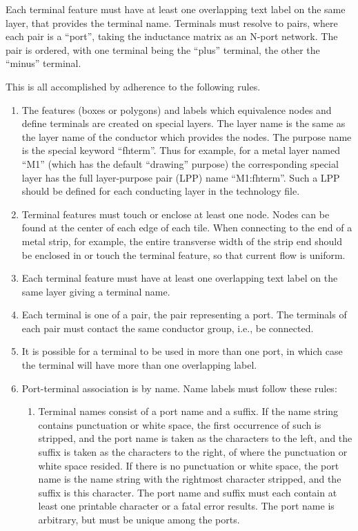 Each terminal feature must have at least one overlapping text label on
the same layer, that provides the terminal name.  Terminals must
resolve to pairs, where each pair is a ``port'', taking the inductance
matrix as an N-port network.  The pair is ordered, with one terminal
being the ``plus'' terminal, the other the ``minus'' terminal.

This is all accomplished by adherence to the following rules.

\begin{enumerate}
\item{The features (boxes or polygons) and labels which equivalence
nodes and define terminals are created on special layers.  The layer
name is the same as the layer name of the conductor which provides the
nodes.  The purpose name is the special keyword ``{\vt fhterm}''. 
Thus for example, for a metal layer named ``{\vt M1}'' (which has the
default ``{\vt drawing}'' purpose) the corresponding special layer has
the full layer-purpose pair (LPP) name ``{\vt M1:fhterm}''.  Such a
LPP should be defined for each conducting layer in the technology
file.}

\item{Terminal features must touch or enclose at least one node. 
Nodes can be found at the center of each edge of each tile.  When
connecting to the end of a metal strip, for example, the entire
transverse width of the strip end should be enclosed in or touch the
terminal feature, so that current flow is uniform.}

\item{Each terminal feature must have at least one overlapping text label
on the same layer giving a terminal name.}

\item{Each terminal is one of a pair, the pair representing a port. 
The terminals of each pair must contact the same conductor group,
i.e., be connected.}

\item{It is possible for a terminal to be used in more than one port,
in which case the terminal will have more than one overlapping label.}

\item{Port-terminal association is by name.  Name labels must follow
these rules:
\begin{enumerate}
\item{Terminal names consist of a port name and a suffix.  If the name
string contains punctuation or white space, the first occurrence of
such is stripped, and the port name is taken as the characters to the
left, and the suffix is taken as the characters to the right, of where
the punctuation or white space resided.  If there is no punctuation or
white space, the port name is the name string with the rightmost
character stripped, and the suffix is this character.  The port name
and suffix must each contain at least one printable character or a
fatal error results.  The port name is arbitrary, but must be unique
among the ports.}


\end{enumerate}}
\end{enumerate}
